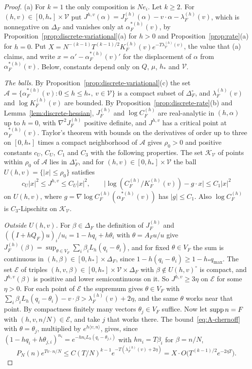 \begin{proof}
(a) For $k=1$ the only composition is $Ne_i$. Let $k\ge2$. For
$(h,v)\in[0,h_*]\times\mathcal V$ put
$J^{h,v}(\alpha)=J^{(h)}_F(\alpha)-v\cdot\alpha-\lambda^{(h)}_F(v)$, which is
nonnegative on $\Delta_F$ and vanishes only at $\alpha^{*(h)}_F(v)$, by
Proposition~\ref{prop:discrete-variational}(a) for $h>0$ and
Proposition~\ref{prop:rate}(a) for $h=0$. Put
$X=N^{-(k-1)}T^{(k-1)/2}K^{(h)}_F(v)e^{-T\lambda^{(h)}_F(v)}$, the value that (a)
claims, and write $x=\alpha'-\alpha^{*(h)}_F(v)'$ for the displacement of $\alpha$
from $\alpha^{*(h)}_F(v)$. Below, constants depend only on $Q$, $\mu$, $h_*$ and
$\mathcal V$.

\emph{The balls.} By Proposition~\ref{prop:discrete-variational}(c) the set
$\mathcal A=\{\alpha^{*(h)}_F(v):0\le h\le h_*,\ v\in\mathcal V\}$ is a compact subset
of $\Delta_F^\circ$, and $\lambda^{(h)}_F(v)$ and $\log K^{(h)}_F(v)$ are bounded. By
Proposition~\ref{prop:discrete-rate}(b) and Lemma~\ref{lem:discrete-hessian},
$J^{(h)}_F$ and $\log C^{(h)}_F$ are real-analytic in $(h,\alpha)$ up to $h=0$, with
$\nabla^2J^{(h)}_F$ positive definite, and $J^{h,v}$ has a critical point at
$\alpha^{*(h)}_F(v)$. Taylor's theorem with bounds on the derivatives of order up to
three on $[0,h_*]$ times a compact neighborhood of $\mathcal A$ gives $\rho_0>0$ and
positive constants $c_U$, $C_U$, $C_1$ and $C_3$ with the following properties. The
set $\mathcal K_{\mathcal V}$ of points within $\rho_0$ of $\mathcal A$ lies in
$\Delta_F^\circ$, and for $(h,v)\in[0,h_*]\times\mathcal V$ the ball
$U(h,v)=\{|x|\le\rho_0\}$ satisfies
\[
c_U|x|^2\le J^{h,v}\le C_U|x|^2,\qquad
\bigl|\log(C^{(h)}_F/K^{(h)}_F(v))-g\cdot x\bigr|\le C_1|x|^2
\]
on $U(h,v)$, where $g=\nabla\log C^{(h)}_F(\alpha^{*(h)}_F(v))$ has $|g|\le C_1$.
Also $\log C^{(h)}_F$ is $C_3$-Lipschitz on $\mathcal K_{\mathcal V}$.

\emph{Outside $U(h,v)$.} For $\beta\in\Delta_F$ the definition of $J^{(h)}_F$ and
$((I+hQ_F)u)_i/u_i=1-hq_i+h\theta_i$ with $\theta=A_Fu/u$ give
$J^{(h)}_F(\beta)=\sup_{\theta\in V_F}\sum_i\beta_iL_h(q_i-\theta_i)$, and for fixed
$\theta\in V_F$ the sum is continuous in $(h,\beta)\in[0,h_*]\times\Delta_F$, since
$1-h(q_i-\theta_i)\ge1-h_*q_{\max}$. The set $\mathcal E$ of triples
$(h,v,\beta)\in[0,h_*]\times\mathcal V\times\Delta_F$ with $\beta\notin U(h,v)^\circ$ is
compact, and $J^{h,v}(\beta)$ is positive and lower semicontinuous on it. So
$J^{h,v}\ge3\eta$ on $\mathcal E$ for some $\eta>0$. For each point of $\mathcal E$
the supremum gives $\theta\in V_F$ with
$\sum_i\beta_iL_h(q_i-\theta_i)-v\cdot\beta>\lambda^{(h)}_F(v)+2\eta$, and the same
$\theta$ works near that point. By compactness finitely many vectors
$\theta_j\in V_F$ suffice. Now let $\operatorname{supp} n=F$ with $(h,v,n/N)\in\mathcal E$, and take $j$ that
works there. The bound~\eqref{eq:A-chernoff} with $\theta=\theta_j$, multiplied by
$e^{h\langle v,n\rangle}$, gives, since
$(1-hq_i+h\theta_{j,i})^{n_i}=e^{-hn_iL_h(q_i-\theta_{j,i})}$ with $hn_i=T\beta_i$ for
$\beta=n/N$,
\[
P_N(n)e^{Tv\cdot n/N}\le C(T/N)^{k-1}e^{-T(\lambda^{(h)}_F(v)+2\eta)}=X\cdot O\bigl(T^{(k-1)/2}e^{-2\eta T}\bigr).
\]


\end{proof}
